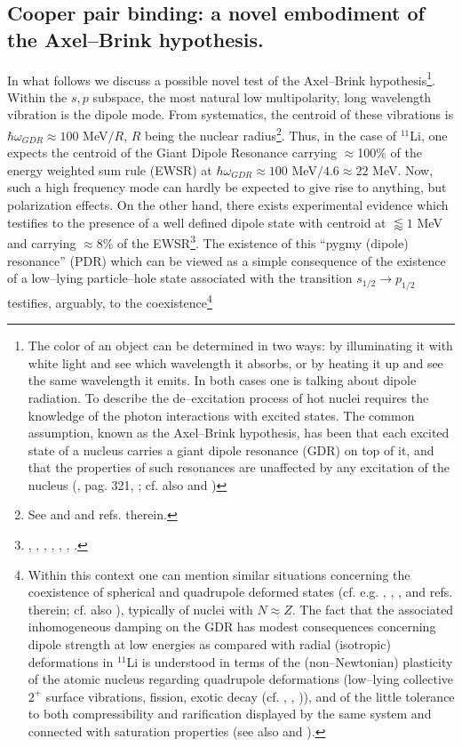 \subsection{Cooper pair binding: a novel embodiment of the Axel--Brink hypothesis.}\label{sect1F1}
In what follows we discuss a possible novel test of the Axel--Brink hypothesis\footnote{The color of an object can be determined in two ways: by illuminating it with white light and see which wavelength it absorbs, or by heating it up and see the same wavelength it emits. In both cases one is talking about dipole radiation. To describe the de--excitation process of hot nuclei requires the knowledge of the photon interactions with excited states. The common assumption, known as the Axel--Brink hypothesis, has been that each excited state of a nucleus carries a giant dipole resonance (GDR) on top of it, and that the properties of such resonances are unaffected by any excitation of the nucleus (\cite{Brink:55}, \cite{Lynn:68} pag. 321, \cite{Axel:62}; cf. also \cite{Bertsch:86} and \cite{Bortignon:98})}. Within the $s,p$ subspace, the most natural low multipolarity, long wavelength vibration is the dipole mode. From systematics, the centroid of these vibrations is $\hbar \omega_{GDR}\approx 100$ MeV$/R$, $R$ being the nuclear radius\footnote{See \cite{Bohr:75} \cite{Bortignon:98} and \cite{Bertsch:05} and refs. therein.}. Thus, in the case of $^{11}$Li, one expects the centroid of the Giant Dipole Resonance carrying $\approx$100\% of the energy weighted sum rule (EWSR) at $\hbar \omega_{GDR}\approx 100$ MeV$/4.6\approx 22$ MeV. Now, such a high frequency mode can hardly be expected to give rise to anything, but polarization effects. On the other hand, there exists experimental evidence which testifies to the presence of a well defined dipole state with centroid at $\lessapprox1$ MeV and carrying $\approx 8$\% of the EWSR\footnote{\cite{Zinser:97}, \cite{Nakamura:06}, \cite{Shimoura:95}, \cite{Ieki:93}, \cite{Sackett:93}, \cite{Kanungo:15}, \cite{Kobayashi:89}.}. The existence of this ``pygmy (dipole) resonance'' (PDR) which can be viewed as a simple consequence of the existence of a low--lying particle--hole state associated with the transition $s_{1/2}\rightarrow p_{1/2}$ testifies, arguably, to the coexistence\footnote{Within this context one can mention similar situations concerning the coexistence of spherical and quadrupole deformed states (cf. e.g. \cite{Wimmer:10}, \cite{Federman:65}, \cite{Federman:66}, \cite{Donau:67} and refs. therein; cf. also \cite{Bohr:63}), typically of nuclei with $N\approx Z$. The fact that the associated inhomogeneous damping on the GDR has modest consequences concerning dipole strength at low energies as compared with radial (isotropic) deformations in $^{11}$Li is understood in terms of the (non--Newtonian) plasticity of the atomic nucleus regarding quadrupole deformations (low--lying collective $2^+$ surface vibrations, fission, exotic decay (cf. \cite{Barranco:88}, \cite{Barranco:89,Bertsch:88b}, \cite{Bertsch:87})), and of the little tolerance to both compressibility and rarification displayed by the same system and connected with saturation properties (see also \cite{Broglia:19} and \cite{Broglia:19b}).} 

